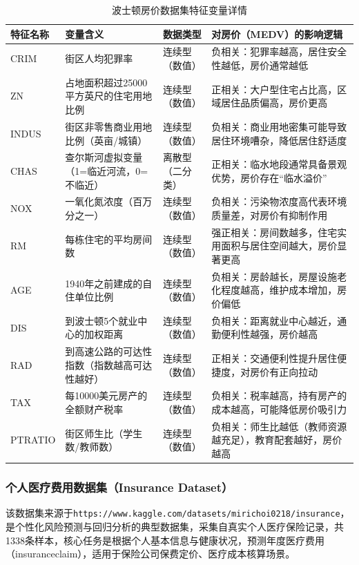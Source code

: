 \begin{table}[!hpt]
  \caption{波士顿房价数据集特征变量详情}
  \label{tab:boston_house_features}
  \centering
  \small
  \begin{tabular}{@{}p{}p{}p{}p{}@{}} \toprule
    \textbf{特征名称} & \textbf{变量含义} & \textbf{数据类型} & \textbf{对房价（MEDV）的影响逻辑} \\ \midrule
    CRIM & 街区人均犯罪率 & 连续型（数值） & 负相关：犯罪率越高，居住安全性越低，房价通常越低 \\
    ZN & 占地面积超过25000平方英尺的住宅用地比例 & 连续型（数值） & 正相关：大户型住宅占比高，区域居住品质偏高，房价更高 \\
    INDUS & 街区非零售商业用地比例（英亩/城镇） & 连续型（数值） & 负相关：商业用地密集可能导致居住环境嘈杂，降低居住舒适度 \\
    CHAS & 查尔斯河虚拟变量（1=临近河流，0=不临近） & 离散型（二分类） & 正相关：临水地段通常具备景观优势，房价存在“临水溢价” \\
    NOX & 一氧化氮浓度（百万分之一） & 连续型（数值） & 负相关：污染物浓度高代表环境质量差，对房价有抑制作用 \\
    RM & 每栋住宅的平均房间数 & 连续型（数值） & 强正相关：房间数越多，住宅实用面积与居住空间越大，房价显著更高 \\
    AGE & 1940年之前建成的自住单位比例 & 连续型（数值） & 负相关：房龄越长，房屋设施老化程度越高，维护成本增加，房价偏低 \\
    DIS & 到波士顿5个就业中心的加权距离 & 连续型（数值） & 负相关：距离就业中心越近，通勤便利性越强，房价越高 \\
    RAD & 到高速公路的可达性指数（指数越高可达性越好） & 连续型（数值） & 正相关：交通便利性提升居住便捷度，对房价有正向拉动 \\
    TAX & 每10000美元房产的全额财产税率 & 连续型（数值） & 负相关：税率越高，持有房产的成本越高，可能降低房价吸引力 \\
    PTRATIO & 街区师生比（学生数/教师数） & 连续型（数值） & 负相关：师生比越低（教师资源越充足），教育配套越好，房价越高 \\ \bottomrule
  \end{tabular}
\end{table}


\subsubsection{个人医疗费用数据集（Insurance Dataset）}
该数据集来源于\texttt{https://www.kaggle.com/datasets/mirichoi0218/insurance}，是个性化风险预测与回归分析的典型数据集，采集自真实个人医疗保险记录，共1338条样本，核心任务是根据个人基本信息与健康状况，预测年度医疗费用（insuranceclaim），适用于保险公司保费定价、医疗成本核算场景。


